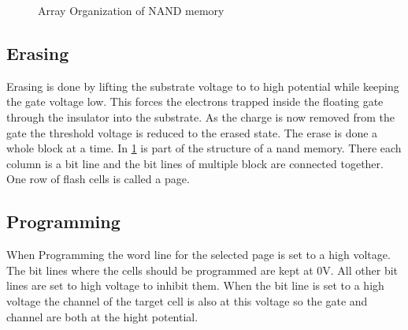 \begin{figure}
    \centering
    \caption{Array Organization of NAND memory}
    \label{nand_array}
\end{figure}

\subsection{Erasing}
Erasing is done by lifting the substrate voltage to to high potential while keeping the gate voltage low. This forces the electrons trapped inside the floating gate through the insulator into the substrate. As the charge is now removed from the gate the threshold voltage is reduced to the erased state. The erase is done a whole block at a time. In \cref{nand_array} is part of the structure of a nand memory. There each column is a bit line and the bit lines of multiple block are connected together. One row of flash cells is called a page.

\subsection{Programming}
When Programming the word line for the selected page is set to a high voltage. The bit lines where the cells should be programmed are kept at 0V. All other bit lines are set to high voltage to inhibit them. When the bit line is set to a high voltage the channel of the target cell is also at this voltage so the gate and channel are both at the hight potential.


